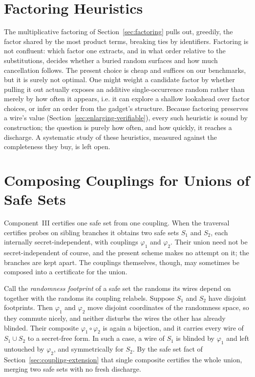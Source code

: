 \section{Factoring Heuristics}
\label{sec:fw-factoring}

The multiplicative factoring of Section~\ref{sec:factoring} pulls out, greedily,
the factor shared by the most product terms, breaking ties by identifiers.
Factoring is not confluent: which factor one extracts, and in what order relative
to the substitutions, decides whether a buried random surfaces and how much
cancellation follows. The present choice is cheap and suffices on our benchmarks,
but it is surely not optimal. One might weight a candidate factor by whether
pulling it out actually exposes an additive single-occurrence random rather than
merely by how often it appears, i.e. it can explore a shallow lookahead over factor choices, or
infer an order from the gadget's structure. Because factoring preserves a
wire's value (Section~\ref{sec:enlarging-verifiable}), every such heuristic is
sound by construction; the question is purely how often, and how quickly, it
reaches a discharge. A systematic study of these heuristics, measured against the
completeness they buy, is left open.

\section{Composing Couplings for Unions of Safe Sets}
\label{sec:fw-coupling-union}

Component~III certifies one safe set from one coupling. When the traversal
certifies probes on sibling branches it obtains two safe sets $S_1$ and $S_2$, each
internally secret-independent, with couplings $\varphi_1$ and $\varphi_2$. Their
union need not be secret-independent of course, and the present scheme makes no attempt on
it; the branches are kept apart. The couplings themselves, though, may sometimes be
composed into a certificate for the union.

Call the \emph{randomness footprint} of a safe set the randoms its wires depend on
together with the randoms its coupling relabels. Suppose $S_1$ and $S_2$ have
disjoint footprints. Then $\varphi_1$ and $\varphi_2$ move disjoint coordinates of
the randomness space, so they commute nicely, and neither disturbs the wires the other has
already blinded. Their composite $\varphi_1 \circ \varphi_2$ is again
a bijection, and it carries every wire of $S_1 \cup S_2$ to a secret-free
form. In such a case, a wire of $S_1$ is blinded by $\varphi_1$ and left untouched by $\varphi_2$,
and symmetrically for $S_2$. By the safe set fact of
Section~\ref{sec:coupling-extension} that single composite certifies the whole
union, merging two safe sets with no fresh discharge.

